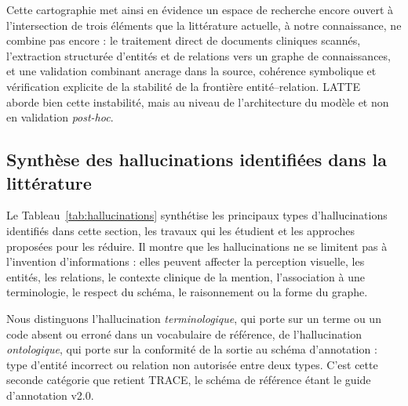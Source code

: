 Cette cartographie met ainsi en évidence un espace de recherche encore ouvert à l'intersection de trois éléments que la littérature actuelle, à notre connaissance, ne combine pas encore : le traitement direct de documents cliniques scannés, l'extraction structurée d'entités et de relations vers un graphe de connaissances, et une validation combinant ancrage dans la source, cohérence symbolique et vérification explicite de la stabilité de la frontière entité--relation. LATTE~\cite{zhang2026latte} aborde bien cette instabilité, mais au niveau de l'architecture du modèle et non en validation \textit{post-hoc}.


\subsection{Synthèse des hallucinations identifiées dans la littérature}

Le Tableau~\ref{tab:hallucinations} synthétise les principaux types d'hallucinations identifiés dans cette section, les travaux qui les étudient et les approches proposées pour les réduire. Il montre que les hallucinations ne se limitent pas à l'invention d'informations : elles peuvent affecter la perception visuelle, les entités, les relations, le contexte clinique de la mention, l'association à une terminologie, le respect du schéma, le raisonnement ou la forme du graphe.

Nous distinguons l'hallucination \textit{terminologique}, qui porte sur un terme ou un code absent ou erroné dans un vocabulaire de référence, de l'hallucination \textit{ontologique}, qui porte sur la conformité de la sortie au schéma d'annotation : type d'entité incorrect ou relation non autorisée entre deux types. C'est cette seconde catégorie que retient TRACE, le schéma de référence étant le guide d'annotation v2.0.


